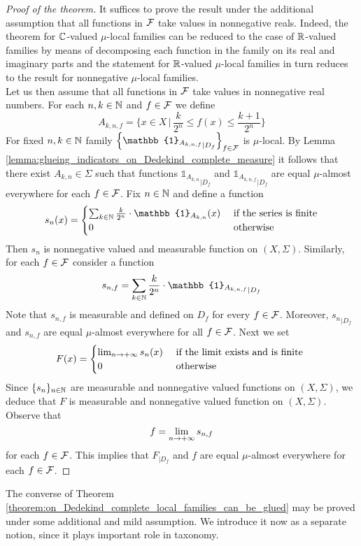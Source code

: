 \begin{proof}[Proof of the theorem]
  It suffices to prove the result under the additional assumption that all functions in ${\mathcal F}$ take values in nonnegative reals. Indeed, the theorem for ${\mathbb C}$-valued $\mu$-local families can be reduced to the case of ${\mathbb R}$-valued families by means of decomposing each function in the family on its real and imaginary parts and the statement for ${\mathbb R}$-valued $\mu$-local families in turn reduces to the result for nonnegative $\mu$-local families.\\
  Let us then assume that all functions in ${\mathcal F}$ take values in nonnegative real numbers. For each $n,k \in {\mathbb N}$ and $f \in {\mathcal F}$ we define
  $$A_{k,n,f} = \bigg\{x \in X \,\bigg|\,\frac{k}{2^n} \leq f(x) \leq \frac{k+1}{2^n} \bigg\}$$
  For fixed $n, k\in {\mathbb N}$ family $\left\{{\mathbb{1}_{A_{k,n,f}}}_{\mid D_f}\right\}_{f\in \cF}$ is $\mu$-local. By Lemma \ref{lemma:glueing_indicators_on_Dedekind_complete_measure} it follows that there exist $A_{k,n} \in \Sigma$ such that functions ${\mathbb{1}_{A_{k,n}}}_{\mid D_f}$ and ${\mathbb{1}_{A_{k,n,f}}}_{\mid D_f}$ are equal $\mu$-almost everywhere for each $f \in {\mathcal F}$. Fix $n \in {\mathbb N}$ and define a function
  $$s_n(x) = \begin{cases}
    \sum_{k\in \NN}\frac{k}{2^n}\cdot \mathbb{1}_{A_{k,n}}(x)&\mbox{ if the series is finite}\\
    0&\mbox{ otherwise }
  \end{cases}$$
  Then $s_n$ is nonnegative valued and measurable function on $(X,\Sigma)$. Similarly, for each $f \in {\mathcal F}$ consider a function
  $$s_{n,f} = \sum_{k\in \NN}\frac{k}{2^n}\cdot {\mathbb{1}_{A_{k,n,f}}}_{\mid D_f}$$
  Note that $s_{n,f}$ is measurable and defined on $D_f$ for every $f \in {\mathcal F}$. Moreover, ${s_n}_{\mid D_f}$ and $s_{n,f}$ are equal $\mu$-almost everywhere for all $f \in {\mathcal F}$. Next we set 
  $$F(x) = \begin{cases}
    \lim_{n\rightarrow +\infty}s_{n}(x)&\mbox{ if the limit exists and is finite }\\
    0&\mbox{ otherwise }
  \end{cases}$$
  Since $\{s_n\}_{n\in {\mathbb N}}$ are measurable and nonnegative valued functions on $(X,\Sigma)$, we deduce that $F$ is measurable and nonnegative valued function on $(X,\Sigma)$. Observe that
  $$f = \lim_{n\rightarrow +\infty}s_{n,f}$$
  for each $f \in {\mathcal F}$. This implies that $F_{\mid D_f}$ and $f$ are equal $\mu$-almost everywhere for each $f \in {\mathcal F}$.
\end{proof}
\noindent
The converse of Theorem \ref{theorem:on_Dedekind_complete_local_families_can_be_glued} may be proved under some additional and mild assumption. We introduce it now as a separate notion, since it plays important role in taxonomy.

